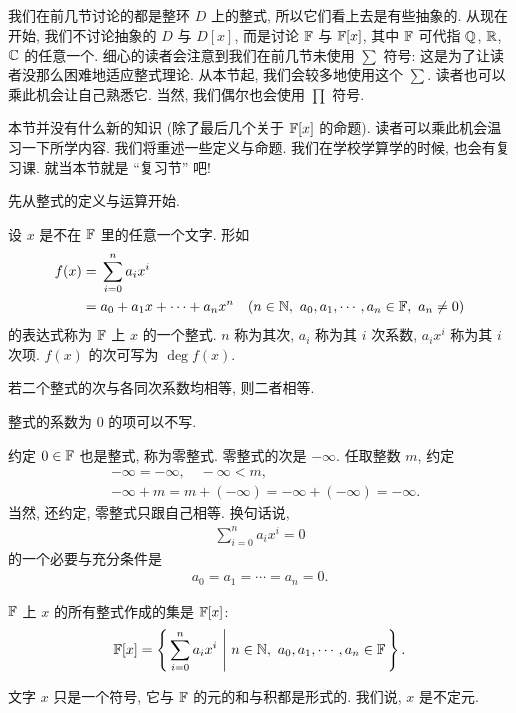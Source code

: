 \subsection*{\PolynomialsOverF}
\markright{\PolynomialsOverF}

我们在前几节讨论的都是整环 $D$ 上的整式, 所以它们看上去是有些抽象的. 从现在开始, 我们不讨论抽象的 $D$ 与 $D[x]$, 而是讨论 $\mathbb{F}$ 与 $\mathbb{F}[x]$, 其中 $\mathbb{F}$ 可代指 $\mathbb{Q}$, $\mathbb{R}$, $\mathbb{C}$ 的任意一个. 细心的读者会注意到我们在前几节未使用 $\sum$ 符号: 这是为了让读者没那么困难地适应整式理论. 从本节起, 我们会较多地使用这个 $\sum$. 读者也可以乘此机会让自己熟悉它. 当然, 我们偶尔也会使用 $\prod$ 符号.

本节并没有什么新的知识 (除了最后几个关于 $\mathbb{F}[x]$ 的命题). 读者可以乘此机会温习一下所学内容. 我们将重述一些定义与命题. 我们在学校学算学的时候, 也会有复习课. 就当本节就是 ``复习节'' 吧!

先从整式的定义与运算开始.

\begin{definition}
    设 $x$ 是不在 $\mathbb{F}$ 里的任意一个文字. 形如
    \begin{align*}
        f(x)
        = {} & \sum_{i=0}^n a_i x^i                                                                       \\
        = {} & a_0 + a_1 x + \cdots + a_n x^n \quad (n \in \NN,\ a_0,a_1,\cdots,a_n \in \FF,\ a_n \neq 0)
    \end{align*}
    的表达式称为 $\mathbb{F}$ 上 $x$ 的一个整式. $n$ 称为其次, $a_i$ 称为其 $i$ 次系数, $a_i x^i$ 称为其 $i$ 次项. $f(x)$ 的次可写为 $\deg f(x)$.

    若二个整式的次与各同次系数均相等, 则二者相等.

    整式的系数为 $0$ 的项可以不写.

    约定 $0 \in \mathbb{F}$ 也是整式, 称为零整式. 零整式的次是 $-\infty$. 任取整数 $m$, 约定
    \begin{align*}
         & -\infty = -\infty, \quad -\infty < m,                        \\
         & -\infty + m = m + (-\infty) = -\infty + (-\infty) = -\infty.
    \end{align*}
    当然, 还约定, 零整式只跟自己相等. 换句话说,
    \begin{align*}
        \sum_{i=0}^n a_i x^i = 0
    \end{align*}
    的一个必要与充分条件是
    \begin{align*}
        a_0 = a_1 = \cdots = a_n = 0.
    \end{align*}

    $\mathbb{F}$ 上 $x$ 的所有整式作成的集是 $\mathbb{F}[x]$:
    \begin{align*}
        \mathbb{F}[x] = \left\{\, \sum_{i=0}^n a_i x^i \,\,\middle|\,\, n \in \mathbb{N},\ a_0,a_1,\cdots,a_n \in \mathbb{F} \,\right\}.
    \end{align*}

    文字 $x$ 只是一个符号, 它与 $\mathbb{F}$ 的元的和与积都是形式的. 我们说, $x$ 是不定元.
\end{definition}

